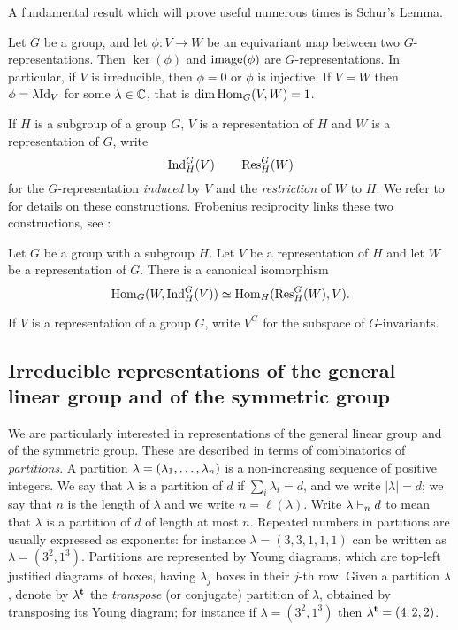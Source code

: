 A fundamental result which will prove useful numerous times is Schur's Lemma. 
\begin{lemma}
\label{introduction-lemma-Schur}
Let $G$ be a group, and let $\phi : V \to W$ be an equivariant map between two $G$-representations. Then $\ker(\phi)$ and $\mathrm{image}(\phi)$ are $G$-representations. In particular, if $V$ is irreducible, then $\phi = 0$ or $\phi$ is injective. If $V= W$ then $\phi = \lambda \mathrm{Id}_V$ for some $\lambda \in \mathbb{C}$, that is $\dim \operatorname{Hom} _G(V,W) = 1$.
\end{lemma}

If $H$ is a subgroup of a group $G$, $V$ is a representation of $H$ and $W$ is a representation of $G$, write 
\[
\operatorname{Ind}_H^G ( V) \qquad \operatorname{Res}_H^G (W)
\]
for the $G$-representation \emph{induced} by $V$ and the \emph{restriction} of $W$ to $H$. We refer to \cite[Sec. 4.4.1]{GW09} for details on these constructions. Frobenius reciprocity links these two constructions, see \cite[Thm. 4.4.1]{GW09}:
\begin{lemma}
 \label{introduction-lemma-Frobeniusreciprocity}
 Let $G$ be a group with a subgroup $H$. Let $V$ be a representation of $H$ and let $W$ be a representation of $G$. There is a canonical isomorphism
 \[
\operatorname{Hom}_G(W,\operatorname{Ind}_H^G ( V)) \simeq \operatorname{Hom}_H (\operatorname{Res}_H^G (W) , V).
 \]
\end{lemma}
If $V$ is a representation of a group $G$, write $V^G$ for the subspace of $G$-invariants. 

\subsection{Irreducible representations of the general linear group and of the symmetric group}
\label{introduction-subsection-irrepsGLandSn}

We are particularly interested in representations of the general linear group and of the symmetric group. These are described in terms of combinatorics of \emph{partitions}. A partition $\lambda = (\lambda_1 , \ldots , \lambda_n)$ is a non-increasing sequence of positive integers. We say that $\lambda$ is a partition of $d$ if $\sum_i \lambda_i = d$, and we write $|\lambda| = d$; we say that $n$ is the length of $\lambda$ and we write $n = \ell(\lambda)$. Write $\lambda \vdash_n d$ to mean that $\lambda$ is a partition of $d$ of length at most $n$. Repeated numbers in partitions are usually expressed as exponents: for instance $\lambda= (3,3,1,1,1)$ can be written as $\lambda = (3^2,1^3)$. Partitions are represented by Young diagrams, which are top-left justified diagrams of boxes, having $\lambda_j$ boxes in their $j$-th row. Given a partition $\lambda$, denote by $\lambda^{\mathbf{t}}$ the \emph{transpose} (or conjugate) partition of $\lambda$, obtained by transposing its Young diagram; for instance if $\lambda = (3^2,1^3)$ then $\lambda^{\mathbf{t}} = (4,2,2)$. 

